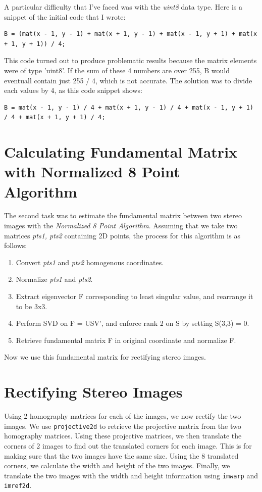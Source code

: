 A particular difficulty that I've faced was with the \emph{uint8} data type. Here is a snippet of the initial code that I wrote:
\begin{lstlisting}[style=Matlab-editor]
B = (mat(x - 1, y - 1) + mat(x + 1, y - 1) + mat(x - 1, y + 1) + mat(x + 1, y + 1)) / 4;
\end{lstlisting}

This code turned out to produce problematic results because the matrix elements were of type 'uint8'. If the sum of these 4 numbers are over 255, B would eventuall contain just 255 / 4, which is not accurate. The solution was to divide each values by 4, as this code snippet shows:
\begin{lstlisting}[style=Matlab-editor]
B = mat(x - 1, y - 1) / 4 + mat(x + 1, y - 1) / 4 + mat(x - 1, y + 1) / 4 + mat(x + 1, y + 1) / 4;
\end{lstlisting}

\section*{Calculating Fundamental Matrix with Normalized 8 Point Algorithm}
The second task was to estimate the fundamental matrix between two stereo images with the \emph{Normalized 8 Point Algorithm}. Assuming that we take two matrices \emph{pts1, pts2} containing 2D points, the process for this algorithm is as follows:
\begin{enumerate}
    \item Convert \emph{pts1} and \emph{pts2} homogenous coordinates.
    \item Normalize \emph{pts1} and \emph{pts2}.
    \item Extract eigenvector F corresponding to least singular value, and rearrange it to be 3x3.
    \item Perform SVD on F = USV', and enforce rank 2 on S by setting S(3,3) = 0.
    \item Retrieve fundamental matrix F in original coordinate and normalize F.
\end{enumerate}
Now we use this fundamental matrix for rectifying stereo images.
\section*{Rectifying Stereo Images}
Using 2 homography matrices for each of the images, we now rectify the two images. We use \texttt{projective2d} to retrieve the projective matrix from the two homography matrices. Using these projective matrices, we then translate the corners of 2 images to find out the translated corners for each image. This is for making sure that the two images have the same size. Using the 8 translated corners, we calculate the width and height of the two images. Finally, we translate the two images with the width and height information using \texttt{imwarp} and \texttt{imref2d}.

